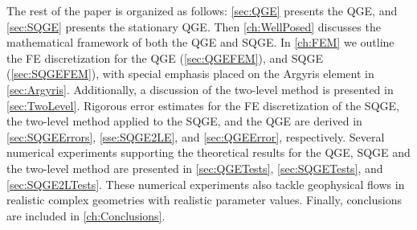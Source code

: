 The rest of the paper is organized as follows: \autoref{sec:QGE} presents the
QGE, and \autoref{sec:SQGE} presents the stationary QGE. Then
\autoref{ch:WellPosed} discusses the mathematical framework of both the QGE
and SQGE.  In \autoref{ch:FEM} we outline the FE discretization for the QGE
(\autoref{sec:QGEFEM}), and SQGE (\autoref{sec:SQGEFEM}), with special emphasis
placed on the Argyris element in \autoref{sec:Argyris}. Additionally, a discussion
of the two-level method is presented in \autoref{sec:TwoLevel}. Rigorous error
estimates for the FE discretization of the SQGE, the two-level method applied
to the SQGE, and the QGE are derived in \autoref{sec:SQGEErrors},
\autoref{sse:SQGE2LE}, and \autoref{sec:QGEError}, respectively.  Several
numerical experiments supporting the theoretical results for the QGE, SQGE and
the two-level method are presented in \autoref{sec:QGETests},
\autoref{sec:SQGETests}, and \autoref{sec:SQGE2LTests}. These numerical
experiments also tackle geophysical flows in realistic complex geometries with
realistic parameter values. Finally, conclusions are included in
\autoref{ch:Conclusions}.

